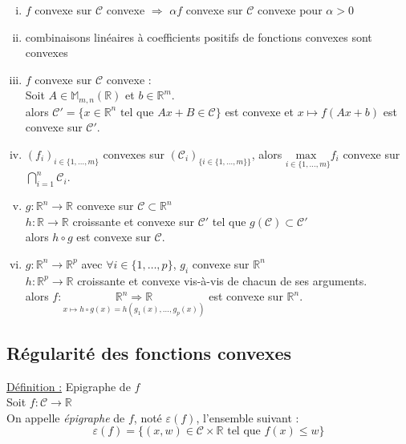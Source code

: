 \documentclass[12pt,a4paper]{article}
\begin{document}
\begin{enumerate}[i)]
    \item $f$ convexe sur $\mathcal{C}$ convexe $\Rightarrow$ $\alpha f$ convexe sur $\mathcal{C}$ convexe pour $\alpha > 0$
    \item combinaisons linéaires à coefficients positifs de fonctions convexes sont convexes
    \item $f$ convexe sur $\mathcal{C}$ convexe :\\
    Soit $A \in \mathbb{M}_{m,n}(\mathbb{R})$ et $b \in \mathbb{R}^m$.\\
    alors $\mathcal{C}' = \{x \in \mathbb{R}^n \text{ tel que } Ax + B \in \mathcal{C}\}$ est convexe et $x \mapsto f(Ax + b)$ est convexe sur $\mathcal{C}'$.
    \item $(f_i)_{i \in \{1, \dots, m\}}$ convexes sur $(\mathcal{C}_i)_{\{i \in \{1, \dots, m\}\}}$, alors $\underset{i \in \{1, \dots, m\}}{\text{max }} f_i$ convexe sur $\bigcap_{i=1}^{n} \mathcal{C}_i$.
    \item $g : \mathbb{R}^n \rightarrow \mathbb{R}$ convexe sur $\mathcal{C} \subset \mathbb{R}^n$\\
    $h : \mathbb{R} \rightarrow \mathbb{R}$ croissante et convexe sur $\mathcal{C}'$ tel que $g(\mathcal{C}) \subset \mathcal{C}'$\\
    alors $h \circ g$ est convexe sur $\mathcal{C}$.
    \item $g : \mathbb{R}^n \rightarrow \mathbb{R}^p$ avec $\forall i \in \{1, \dots, p\}$, $g_i$ convexe sur $\mathbb{R}^n$\\
    $h : \mathbb{R}^p \rightarrow \mathbb{R}$ croissante et convexe vis-à-vis de chacun de ses arguments.\\
    alors $f : \underset{x \mapsto h \circ g(x) = h(g_1(x), \dots, g_p(x))}{\mathbb{R}^n \Rightarrow \mathbb{R}}$ est convexe sur $\mathbb{R}^n$.
\end{enumerate}


\subsection{Régularité des fonctions convexes}

\underline{Définition :} Epigraphe de $f$\\
Soit $f : \mathcal{C} \rightarrow \mathbb{R}$\\
On appelle \textit{épigraphe} de $f$, noté $\varepsilon(f)$, l'ensemble suivant :\\
$$
\varepsilon(f) = \{(x, w) \in \mathcal{C} \times \mathbb{R} \text{ tel que } f(x) \leq w\}
$$
\end{document}
